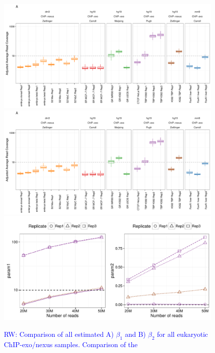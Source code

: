 \documentclass{bmcart}
\newcommand{\RW}[1]{\textcolor{blue}{RW: #1}}
\begin{document}

\newpage


\begin{figure}[h!]
  \centering
  \includegraphics[width = .9  \textwidth,page = 1]{figures/fig5/QC_pipeline_eval_boxplot.pdf}
\newline
  \includegraphics[width = .9  \textwidth,page = 2]{figures/fig5/QC_pipeline_eval_boxplot.pdf}
\newline
\includegraphics[width = .45\textwidth,page = 1]{figures/fig5/TBP_param_depth_trend.pdf}
\caption{\RW{Comparison of all estimated A) $\beta_1$ and B) $\beta_2$
    for all eukaryotic ChIP-exo/nexus samples. Comparison of the
}}
\end{figure}
\end{document}
